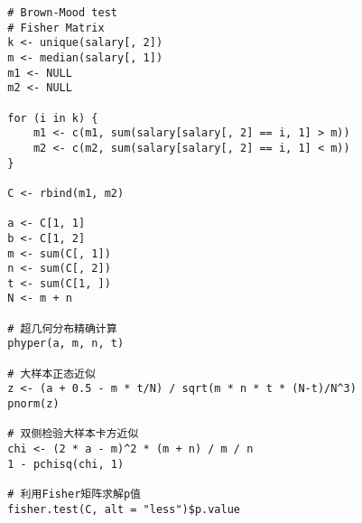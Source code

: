 \documentclass[UTF8]{ctexart}
\numberwithin{equation}{section}
\begin{document}
\begin{center}
    \begin{lstlisting}
        # Brown-Mood test
        # Fisher Matrix
        k <- unique(salary[, 2])
        m <- median(salary[, 1])
        m1 <- NULL
        m2 <- NULL

        for (i in k) {
            m1 <- c(m1, sum(salary[salary[, 2] == i, 1] > m))
            m2 <- c(m2, sum(salary[salary[, 2] == i, 1] < m))
        }

        C <- rbind(m1, m2)

        a <- C[1, 1]
        b <- C[1, 2]
        m <- sum(C[, 1])
        n <- sum(C[, 2])
        t <- sum(C[1, ])
        N <- m + n

        # 超几何分布精确计算
        phyper(a, m, n, t)

        # 大样本正态近似
        z <- (a + 0.5 - m * t/N) / sqrt(m * n * t * (N-t)/N^3)
        pnorm(z)

        # 双侧检验大样本卡方近似
        chi <- (2 * a - m)^2 * (m + n) / m / n
        1 - pchisq(chi, 1)

        # 利用Fisher矩阵求解p值
        fisher.test(C, alt = "less")$p.value
    \end{lstlisting}
\end{center}
\end{document}
